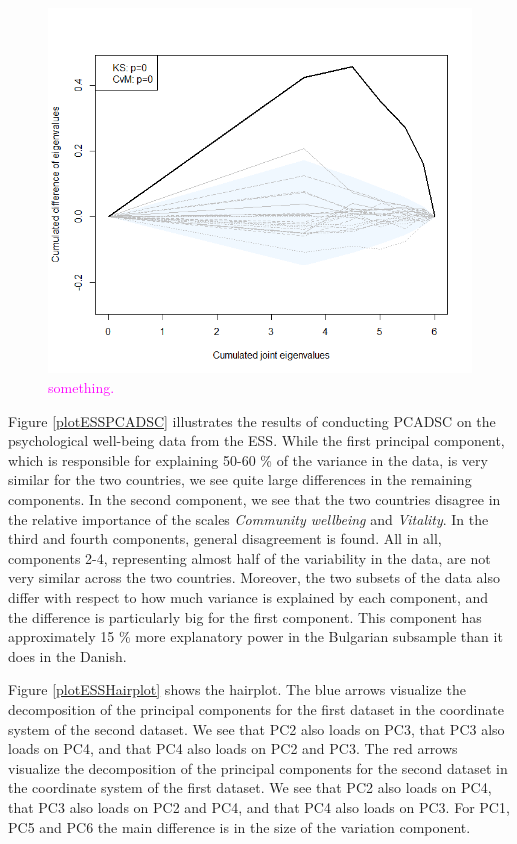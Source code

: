\documentclass[titlepage,11pt,twoside]{article}
\newcommand{\hl}[1]{\textcolor{magenta}{#1}}
\begin{document}
\begin{figure}
\center
\includegraphics[scale = 0.8]{essCumVarAgreement.png}
\caption{\hl{something.}}
\label{plotCumVarAgreement}
\end{figure}

Figure \ref{plotESSPCADSC} illustrates the results of conducting PCADSC on the psychological well-being data from the ESS. While the first principal component, which is responsible for explaining 50-60 \% of the variance in the data, is very similar for the two countries, we see quite large differences in the remaining components. In the second component, we see that the two countries disagree in the relative importance of the scales \textit{Community wellbeing} and \textit{Vitality}. In the third and fourth components, general disagreement  is found. All in all, components 2-4, representing almost half of the variability in the data, are not very similar across the two countries. Moreover, the two subsets of the data also differ with respect to how much variance is explained by each component, and the difference is particularly big for the first component. This component has approximately 15 \%  more explanatory power in the Bulgarian subsample than it does in the Danish.

{\color{red}
Figure \ref{plotESSHairplot} shows the hairplot. The blue arrows visualize the decomposition of the principal components for the first dataset in the coordinate system of the second dataset. We see that PC2 also loads on PC3, that PC3 also loads on PC4, and that PC4 also loads on PC2 and PC3. The red arrows visualize the decomposition of the principal components for the second dataset in the coordinate system of the first dataset. We see that PC2 also loads on PC4, that PC3 also loads on PC2 and PC4, and that PC4 also loads on PC3. For PC1, PC5 and PC6 the main difference is in the size of the variation component.
}
\end{document}
